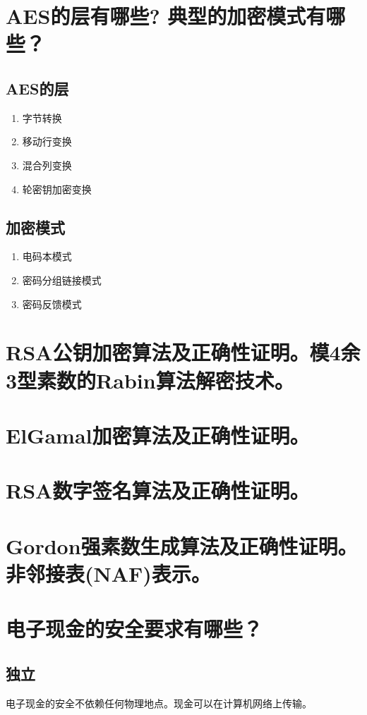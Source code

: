 \documentclass[11pt,a4paper]{article}
\begin{document}
\section{AES的层有哪些? 典型的加密模式有哪些？}

\subsection{AES的层}
\begin{enumerate}
\item 字节转换
\item 移动行变换
\item 混合列变换
\item 轮密钥加密变换
\end{enumerate}
\subsection{加密模式}
\begin{enumerate}
\item 电码本模式
\item 密码分组链接模式
\item 密码反馈模式
\end{enumerate}
\section{RSA公钥加密算法及正确性证明。模4余3型素数的Rabin算法解密技术。}

\section{ElGamal加密算法及正确性证明。}

\section{RSA数字签名算法及正确性证明。}

\section{Gordon强素数生成算法及正确性证明。非邻接表(NAF)表示。}

\section{电子现金的安全要求有哪些？}
\subsection{独立}电子现金的安全不依赖任何物理地点。现金可以在计算机网络上传输。
\end{document}
